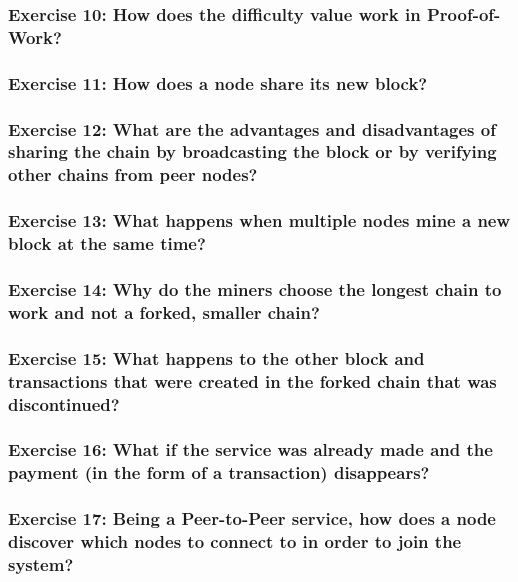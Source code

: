 \documentclass[12pt,a4paper]{article}
\theoremstyle{definition}
\begin{document}
\subsubsection*{Exercise 10: How does the difficulty value work in Proof-of-Work?}


\subsubsection*{Exercise 11: How does a node share its new block?}

\subsubsection*{Exercise 12: What are the advantages and disadvantages of sharing the chain by broadcasting the block or by verifying other chains from peer nodes?}

\subsubsection*{Exercise 13: What happens when multiple nodes mine a new block at the same time?}

\subsubsection*{Exercise 14: Why do the miners choose the longest chain to work and not a forked, smaller chain?}

\subsubsection*{Exercise 15: What happens to the other block and transactions that were created in the forked chain that was discontinued?}



\subsubsection*{Exercise 16: What if the service was already made and the payment (in the form of a transaction) disappears?}

\subsubsection*{Exercise 17: Being a Peer-to-Peer service, how does a node discover which nodes to connect to in order to join the system?}
\end{document}
